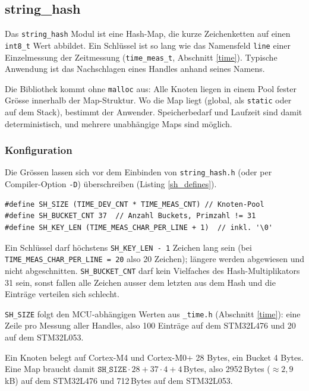 \subsection{string\_hash}\label{string_hash}
Das \verb|string_hash| Modul ist eine Hash-Map, die kurze Zeichenketten auf
einen \verb|int8_t| Wert abbildet. Ein Schlüssel ist so lang wie das Namensfeld
\verb|line| einer Einzelmessung der Zeitmessung (\verb|time_meas_t|,
Abschnitt \ref{time}). Typische Anwendung ist das Nachschlagen eines Handles anhand
seines Namens.

Die Bibliothek kommt ohne \verb|malloc| aus: Alle Knoten liegen in einem Pool
fester Grösse innerhalb der Map-Struktur. Wo die Map liegt (global, als
\verb|static| oder auf dem Stack), bestimmt der Anwender. Speicherbedarf und
Laufzeit sind damit deterministisch, und mehrere unabhängige Maps sind
möglich.

\subsubsection*{Konfiguration}
Die Grössen lassen sich vor dem Einbinden von \verb|string_hash.h| (oder
per Compiler-Option \verb|-D|) überschreiben (Listing \ref{sh_defines}).

\begin{listing}[H]
\begin{verbatim}
#define SH_SIZE (TIME_DEV_CNT * TIME_MEAS_CNT) // Knoten-Pool
#define SH_BUCKET_CNT 37  // Anzahl Buckets, Primzahl != 31
#define SH_KEY_LEN (TIME_MEAS_CHAR_PER_LINE + 1)  // inkl. '\0'
\end{verbatim}
\caption{Konfiguration von \texttt{string\_hash}}
\label{sh_defines}
\end{listing}

Ein Schlüssel darf höchstens \verb|SH_KEY_LEN - 1| Zeichen lang sein (bei
\verb|TIME_MEAS_CHAR_PER_LINE = 20| also 20 Zeichen); längere werden
abgewiesen und nicht abgeschnitten. \verb|SH_BUCKET_CNT| darf kein
Vielfaches des Hash-Multiplikators 31 sein, sonst fallen alle Zeichen
ausser dem letzten aus dem Hash und die Einträge verteilen sich schlecht.

\verb|SH_SIZE| folgt den MCU-abhängigen Werten aus \verb|_time.h|
(Abschnitt \ref{time}): eine Zeile pro Messung aller Handles, also 100
Einträge auf dem STM32L476 und 20 auf dem STM32L053.

Ein Knoten belegt auf Cortex-M4 und Cortex-M0+ 28 Bytes, ein Bucket 4 Bytes.
Eine Map braucht damit $\mathtt{SH\_SIZE} \cdot 28 + 37 \cdot 4 + 4$\,Bytes,
also 2952\,Bytes ($\approx 2{,}9$\,kB) auf dem STM32L476 und 712\,Bytes auf
dem STM32L053.

